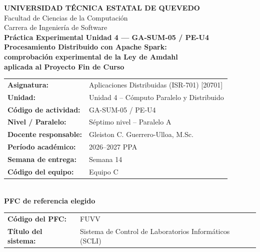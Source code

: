 \documentclass[10pt,journal]{IEEEtran}
\begin{document}
\onecolumn
\thispagestyle{plain}
\begin{center}
{\Large \textbf{UNIVERSIDAD T\'ECNICA ESTATAL DE QUEVEDO}}\\[0.4em]
{\large Facultad de Ciencias de la Computaci\'on}\\[0.2em]
{\large Carrera de Ingenier\'ia de Software}\\[2.0em]

{\large \textbf{Pr\'actica Experimental Unidad 4 --- GA-SUM-05 / PE-U4}}\\[0.6em]
{\LARGE \textbf{Procesamiento Distribuido con Apache Spark:\\[0.2em]
comprobaci\'on experimental de la Ley de Amdahl\\[0.2em]
aplicada al Proyecto Fin de Curso}}\\[2.0em]

\begin{tabular}{ll}
\textbf{Asignatura:} & Aplicaciones Distribuidas (ISR-701) [20701]\\[0.2em]
\textbf{Unidad:} & Unidad 4 -- C\'omputo Paralelo y Distribuido\\[0.2em]
\textbf{C\'odigo de actividad:} & GA-SUM-05 / PE-U4\\[0.2em]
\textbf{Nivel / Paralelo:} & S\'eptimo nivel -- Paralelo A\\[0.2em]
\textbf{Docente responsable:} & Gleiston C. Guerrero-Ulloa, M.Sc.\\[0.2em]
\textbf{Per\'iodo acad\'emico:} & 2026--2027 PPA\\[0.2em]
\textbf{Semana de entrega:} & Semana 14\\[0.2em]
\textbf{C\'odigo del equipo:} & Equipo C\\
\end{tabular}\\[2.0em]

{\large \textbf{PFC de referencia elegido}}\\[0.4em]
\begin{tabular}{ll}
\textbf{C\'odigo del PFC:} & FUVV\\[0.2em]
\textbf{T\'itulo del sistema:} & Sistema de Control de Laboratorios Inform\'aticos (SCLI)\\
\end{tabular}\\[2.0em]


\end{center}
\end{document}
